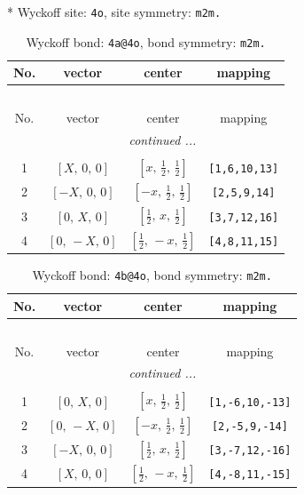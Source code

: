 \documentclass[fleqn,8pt]{jsarticle}
\begin{document}
* Wyckoff site: {\tt 4o}, site symmetry: {\tt m2m.}
\renewcommand{\arraystretch}{1.2}
\begin{longtable}{cccc}
\caption{Wyckoff bond: {\tt 4a@4o}, bond symmetry: {\tt m2m.}}
 \\
 \hline \hline
No. & vector & center & mapping \\ \hline \endfirsthead

\multicolumn{3}{l}{\tablename\ \thetable{}} \\
 \hline \hline
No. & vector & center & mapping \\ \hline \endhead

 \hline \hline
\multicolumn{3}{r}{\footnotesize\it continued ...} \\ \endfoot

 \hline \hline
\multicolumn{3}{r}{} \\ \endlastfoot

1 & $\left[ X,\, 0,\, 0 \right]$ & $\left[ x,\, \frac{1}{2},\, \frac{1}{2} \right]$ & {\tt [1,6,10,13]} \\ \hline
2 & $\left[ - X,\, 0,\, 0 \right]$ & $\left[ - x,\, \frac{1}{2},\, \frac{1}{2} \right]$ & {\tt [2,5,9,14]} \\ \hline
3 & $\left[ 0,\, X,\, 0 \right]$ & $\left[ \frac{1}{2},\, x,\, \frac{1}{2} \right]$ & {\tt [3,7,12,16]} \\ \hline
4 & $\left[ 0,\, - X,\, 0 \right]$ & $\left[ \frac{1}{2},\, - x,\, \frac{1}{2} \right]$ & {\tt [4,8,11,15]} \\
\end{longtable}
\renewcommand{\arraystretch}{1.2}
\begin{longtable}{cccc}
\caption{Wyckoff bond: {\tt 4b@4o}, bond symmetry: {\tt m2m.}}
 \\
 \hline \hline
No. & vector & center & mapping \\ \hline \endfirsthead

\multicolumn{3}{l}{\tablename\ \thetable{}} \\
 \hline \hline
No. & vector & center & mapping \\ \hline \endhead

 \hline \hline
\multicolumn{3}{r}{\footnotesize\it continued ...} \\ \endfoot

 \hline \hline
\multicolumn{3}{r}{} \\ \endlastfoot

1 & $\left[ 0,\, X,\, 0 \right]$ & $\left[ x,\, \frac{1}{2},\, \frac{1}{2} \right]$ & {\tt [1,-6,10,-13]} \\ \hline
2 & $\left[ 0,\, - X,\, 0 \right]$ & $\left[ - x,\, \frac{1}{2},\, \frac{1}{2} \right]$ & {\tt [2,-5,9,-14]} \\ \hline
3 & $\left[ - X,\, 0,\, 0 \right]$ & $\left[ \frac{1}{2},\, x,\, \frac{1}{2} \right]$ & {\tt [3,-7,12,-16]} \\ \hline
4 & $\left[ X,\, 0,\, 0 \right]$ & $\left[ \frac{1}{2},\, - x,\, \frac{1}{2} \right]$ & {\tt [4,-8,11,-15]} \\
\end{longtable}
\end{document}
